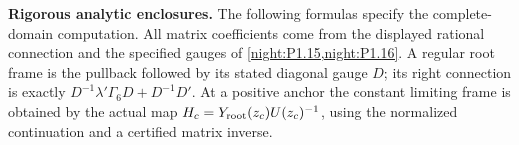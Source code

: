 \item \textbf{Rigorous analytic enclosures.}
The following formulas specify the complete-domain computation.
All matrix coefficients come from the displayed rational
connection and the specified gauges of
\cref{night:P1.15,night:P1.16}. A regular root frame is the
pullback followed by its stated diagonal gauge $D$; its right
connection is exactly
$D^{-1}\lambda'\Gamma_6D+D^{-1}D'$.
At a positive anchor the constant limiting frame is obtained by
the actual map $H_c=Y_{\rm root}(z_c)U(z_c)^{-1}$, using the
normalized continuation and a certified matrix inverse.

